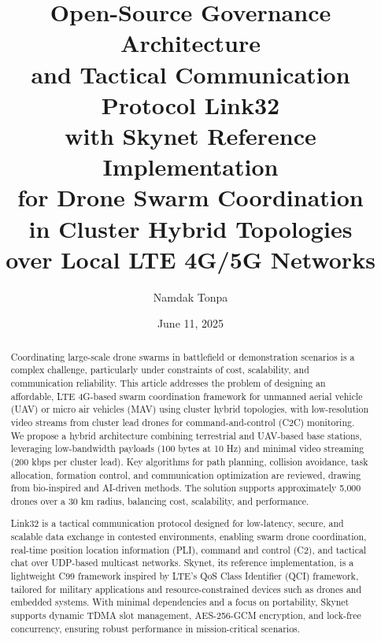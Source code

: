 \documentclass{article}
\begin{document}

\title { Open-Source Governance Architecture       \\
         and Tactical Communication Protocol Link32 \\
         with Skynet Reference Implementation        \\
         for Drone Swarm Coordination \\
         in Cluster Hybrid Topologies  \\
         over Local LTE 4G/5G Networks  \\ }

\author{Namdak Tonpa}
\date{June 11, 2025}
\maketitle

\begin{abstract}
Coordinating large-scale drone swarms in battlefield or demonstration scenarios
is a complex challenge, particularly under constraints of cost, scalability,
and communication reliability. This article addresses the problem of designing an affordable,
LTE 4G-based swarm coordination framework for unmanned aerial vehicle (UAV)
or micro air vehicles (MAV) using cluster hybrid topologies,
with low-resolution video streams from cluster lead drones for
command-and-control (C2C) monitoring. We propose a hybrid architecture combining
terrestrial and UAV-based base stations, leveraging low-bandwidth
payloads (100 bytes at 10 Hz) and minimal video streaming (200 kbps per cluster lead).
Key algorithms for path planning, collision avoidance, task allocation, formation control,
and communication optimization are reviewed, drawing from bio-inspired and AI-driven methods.
The solution supports approximately 5,000 drones over a 30 km radius, balancing cost,
scalability, and performance.

Link32 is a tactical communication protocol designed for low-latency, secure, and scalable data
exchange in contested environments, enabling swarm drone coordination, real-time position location
information (PLI), command and control (C2), and tactical chat over UDP-based multicast networks.
Skynet, its reference implementation, is a lightweight C99 framework inspired by LTE’s QoS Class
Identifier (QCI) framework, tailored for military applications and resource-constrained devices
such as drones and embedded systems. With minimal dependencies and a focus on portability, Skynet
supports dynamic TDMA slot management, AES-256-GCM encryption, and lock-free concurrency, ensuring
robust performance in mission-critical scenarios.
\end{abstract}
\end{document}
